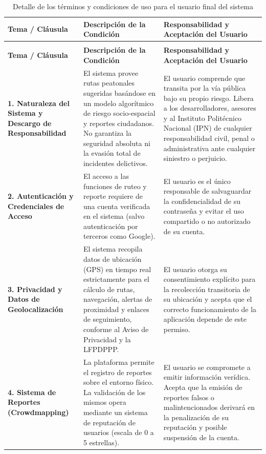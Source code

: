 \begin{longtable}{|>{\raggedright\arraybackslash}p{}|>{\raggedright\arraybackslash}p{}|>{\raggedright\arraybackslash}p{}|}
\caption{Detalle de los términos y condiciones de uso para el usuario final del sistema}\label{tab:terminos_condiciones} \\
\hline
\rowcolor{gray!15}
\textbf{Tema / Cláusula} & \textbf{Descripción de la Condición} & \textbf{Responsabilidad y Aceptación del Usuario} \\ \hline
\endfirsthead
\multicolumn{3}{c}{\bfseries Continuación de la Tabla \thetable} \\
\hline
\rowcolor{gray!15}
\textbf{Tema / Cláusula} & \textbf{Descripción de la Condición} & \textbf{Responsabilidad y Aceptación del Usuario} \\ \hline
\endhead

\textbf{1. Naturaleza del Sistema y Descargo de Responsabilidad} & 
El sistema provee rutas peatonales sugeridas basándose en un modelo algorítmico de riesgo socio-espacial y reportes ciudadanos. No garantiza la seguridad absoluta ni la evasión total de incidentes delictivos. & 
El usuario comprende que transita por la vía pública bajo su propio riesgo. Libera a los desarrolladores, asesores y al Instituto Politécnico Nacional (IPN) de cualquier responsabilidad civil, penal o administrativa ante cualquier siniestro o perjuicio. \\ \hline

\textbf{2. Autenticación y Credenciales de Acceso} & 
El acceso a las funciones de ruteo y reporte requiere de una cuenta verificada en el sistema (salvo autenticación por terceros como Google). & 
El usuario es el único responsable de salvaguardar la confidencialidad de su contraseña y evitar el uso compartido o no autorizado de su cuenta. \\ \hline

\textbf{3. Privacidad y Datos de Geolocalización} & 
El sistema recopila datos de ubicación (GPS) en tiempo real estrictamente para el cálculo de rutas, navegación, alertas de proximidad y enlaces de seguimiento, conforme al Aviso de Privacidad y la LFPDPPP. & 
El usuario otorga su consentimiento explícito para la recolección transitoria de su ubicación y acepta que el correcto funcionamiento de la aplicación depende de este permiso. \\ \hline

\textbf{4. Sistema de Reportes (Crowdmapping)} & 
La plataforma permite el registro de reportes sobre el entorno físico. La validación de los mismos opera mediante un sistema de reputación de usuarios (escala de 0 a 5 estrellas). & 
El usuario se compromete a emitir información verídica. Acepta que la emisión de reportes falsos o malintencionados derivará en la penalización de su reputación y posible suspensión de la cuenta. \\ \hline


\end{longtable}
